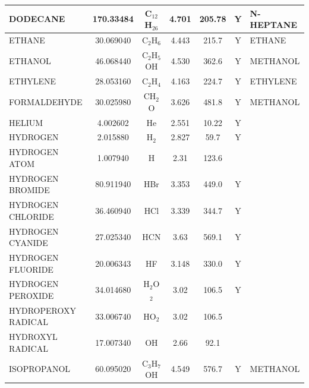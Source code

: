\documentclass[11pt]{book}
\begin{document}
\begin{longtable}{@{\extracolsep{\fill}}|l|c|c|c|c|c|l|}
{\ct DODECANE}           & 170.33484  & C$_12$H$_26$     & 4.701    & 205.78   &  Y       &  {\ct N-HEPTANE}           \\ \hline
{\ct ETHANE}             & 30.069040  & C$_2$H$_6$       & 4.443    & 215.7    &  Y       &  {\ct ETHANE}              \\ \hline
{\ct ETHANOL}            & 46.068440  & C$_2$H$_5$OH     & 4.530    & 362.6    &  Y       &  {\ct METHANOL}            \\ \hline
{\ct ETHYLENE}           & 28.053160  & C$_2$H$_4$       & 4.163    & 224.7    &  Y       &  {\ct ETHYLENE}            \\ \hline
{\ct FORMALDEHYDE}       & 30.025980  & CH$_2$O          & 3.626    & 481.8    &  Y       &  {\ct METHANOL}            \\ \hline
{\ct HELIUM}             & 4.002602   & He               & 2.551    & 10.22    &  Y       &                            \\ \hline
{\ct HYDROGEN}           & 2.015880   & H$_2$            & 2.827    & 59.7     &  Y       &                            \\ \hline
{\ct HYDROGEN ATOM}      & 1.007940   & H                & 2.31     & 123.6    &          &                            \\ \hline
{\ct HYDROGEN BROMIDE}   & 80.911940  & HBr              & 3.353    & 449.0    &  Y       &                            \\ \hline
{\ct HYDROGEN CHLORIDE}  & 36.460940  & HCl              & 3.339    & 344.7    &  Y       &                            \\ \hline
{\ct HYDROGEN CYANIDE}   & 27.025340  & HCN              & 3.63     & 569.1    &  Y       &                            \\ \hline
{\ct HYDROGEN FLUORIDE}  & 20.006343  & HF               & 3.148    & 330.0    &  Y       &                            \\ \hline
{\ct HYDROGEN PEROXIDE}  & 34.014680  & H$_2$O$_2$       & 3.02     & 106.5    &  Y       &                            \\ \hline
{\ct HYDROPEROXY RADICAL}& 33.006740  & HO$_2$           & 3.02     & 106.5    &          &                            \\ \hline
{\ct HYDROXYL RADICAL}   & 17.007340  & OH               & 2.66     & 92.1     &          &                            \\ \hline
{\ct ISOPROPANOL}        & 60.095020  & C$_3$H$_7$OH     & 4.549    & 576.7    &  Y       &  {\ct METHANOL}            \\ \hline

\end{longtable}
\end{document}
